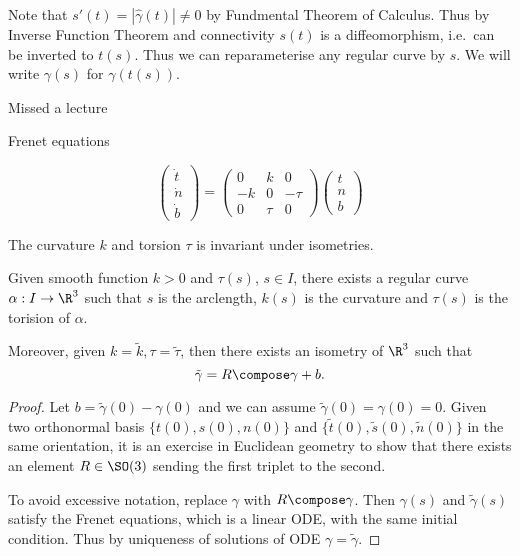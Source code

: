 \documentclass[a4paper]{article}
\begin{document}
Note that \(s'(t) = |\hat \gamma(t)| \neq 0\) by Fundmental Theorem of Calculus. Thus by Inverse Function Theorem and connectivity \(s(t)\) is a diffeomorphism, i.e.\ can be inverted to \(t(s)\). Thus we can reparameterise any regular curve by \(s\). We will write \(\gamma(s)\) for \(\gamma(t(s))\).

Missed a lecture

Frenet equations

\[
  \begin{pmatrix}
    \dot t \\
    \dot n \\
    \dot b
  \end{pmatrix}
  =
  \begin{pmatrix}
    0 & k & 0 \\
    -k & 0 & -\tau \\
    0 & \tau & 0 
  \end{pmatrix}
  \begin{pmatrix}
    t \\
    n \\
    b
  \end{pmatrix}
\]

The curvature \(k\) and torsion \(\tau\) is invariant under isometries. 

\begin{theorem}
  Given smooth function \(k > 0\) and \(\tau(s)\), \(s \in I\), there exists a regular curve \(\alpha: I \to \R^3\) such that \(s\) is the arclength, \(k(s)\) is the curvature and \(\tau(s)\) is the torision of \(\alpha\).

  Moreover, given \(k = \tilde k, \tau = \tilde \tau\), then there exists an isometry of \(\R^3\) such that
  \[
    \tilde \gamma = R \compose \gamma + b.
  \]
\end{theorem}

\begin{proof}
  Let \(b = \tilde \gamma(0) - \gamma(0)\) and we can assume \(\tilde \gamma(0) = \gamma(0) = 0\). Given two orthonormal basis \(\{t(0), s(0), n(0)\}\) and \(\{\tilde t(0), \tilde s(0), \tilde n(0)\}\) in the same orientation, it is an exercise in Euclidean geometry to show that there exists an element \(R \in \SO(3)\) sending the first triplet to the second.

  To avoid excessive notation, replace \(\gamma\) with \(R \compose \gamma\). Then \(\gamma(s)\) and \(\tilde \gamma(s)\) satisfy the Frenet equations, which is a linear ODE, with the same initial condition. Thus by uniqueness of solutions of ODE \(\gamma = \tilde \gamma\).
\end{proof}
\end{document}
